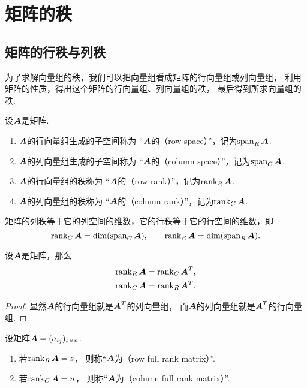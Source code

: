 \section{矩阵的秩}
\subsection{矩阵的行秩与列秩}
为了求解向量组的秩，我们可以把向量组看成矩阵的行向量组或列向量组，
利用矩阵的性质，得出这个矩阵的行向量组、列向量组的秩，
最后得到所求向量组的秩.

\begin{definition}\label{definition:线性方程组.行秩与列秩的定义}
设\(\boldsymbol{A}\)是矩阵.
\begin{enumerate}
	\item \(\boldsymbol{A}\)的行向量组生成的子空间称为
	“\(\boldsymbol{A}\)的（row space）”，记为\(\operatorname{span}_R\boldsymbol{A}\).
	\item \(\boldsymbol{A}\)的列向量组生成的子空间称为
	“\(\boldsymbol{A}\)的（column space）”，记为\(\operatorname{span}_C\boldsymbol{A}\).
	\item \(\boldsymbol{A}\)的行向量组的秩称为
	“\(\boldsymbol{A}\)的（row rank）”，记为\(\rank_R\boldsymbol{A}\).
	\item \(\boldsymbol{A}\)的列向量组的秩称为
	“\(\boldsymbol{A}\)的（column rank）”，记为\(\rank_C\boldsymbol{A}\).
\end{enumerate}
\end{definition}

矩阵的列秩等于它的列空间的维数，它的行秩等于它的行空间的维数，即\[
	\rank_C\boldsymbol{A}=\dim(\operatorname{span}_C\boldsymbol{A}), \qquad
	\rank_R\boldsymbol{A}=\dim(\operatorname{span}_R\boldsymbol{A}).
\]

\begin{proposition}\label{theorem:向量空间.矩阵的行秩与列秩分别等于它的转置矩阵的列秩与行秩}
设\(\boldsymbol{A}\)是矩阵，那么\begin{gather}
	\rank_R\boldsymbol{A}=\rank_C\boldsymbol{A}^T, \\
	\rank_C\boldsymbol{A}=\rank_R\boldsymbol{A}^T.
\end{gather}
\begin{proof}
显然\(\boldsymbol{A}\)的行向量组就是\(\boldsymbol{A}^T\)的列向量组，
而\(\boldsymbol{A}\)的列向量组就是\(\boldsymbol{A}^T\)的行向量组.
\end{proof}
\end{proposition}

\begin{definition}
设矩阵\(\boldsymbol{A} = (a_{ij})_{s \times n}\).
\begin{enumerate}
	\item 若\(\rank_R\boldsymbol{A} = s\)，
	则称“\(\boldsymbol{A}\)为（row full rank matrix）”.
	\item 若\(\rank_C\boldsymbol{A} = n\)，
	则称“\(\boldsymbol{A}\)为（column full rank matrix）”.
\end{enumerate}
\end{definition}

